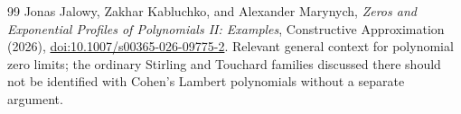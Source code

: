 \documentclass[11pt]{article}
\numberwithin{equation}{section}
\theoremstyle{definition}
\theoremstyle{remark}
\begin{document}
\begin{thebibliography}{99}
Jonas Jalowy, Zakhar Kabluchko, and Alexander Marynych,
\emph{Zeros and Exponential Profiles of Polynomials II: Examples},
Constructive Approximation (2026),
\href{https://doi.org/10.1007/s00365-026-09775-2}{doi:10.1007/s00365-026-09775-2}.
Relevant general context for polynomial zero limits; the ordinary
Stirling and Touchard families discussed there should not be identified
with Cohen's Lambert polynomials without a separate argument.

\end{thebibliography}
\end{document}
